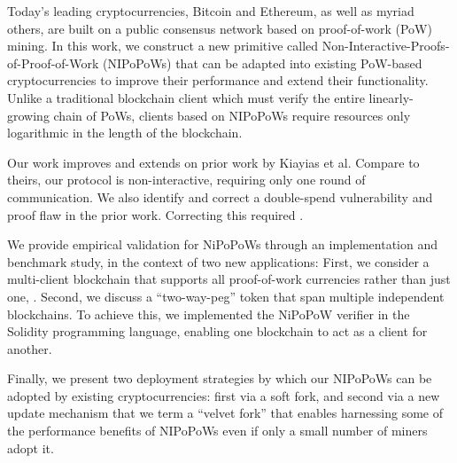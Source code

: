 Today's leading cryptocurrencies, Bitcoin and Ethereum, as well as myriad others, are built on a public consensus network based on proof-of-work (PoW) mining. In this work, we construct a new primitive called Non-Interactive-Proofs-of-Proof-of-Work (NIPoPoWs) that can be adapted into existing PoW-based cryptocurrencies to improve their performance and extend their functionality.
Unlike a traditional blockchain client
which must verify the entire linearly-growing chain of PoWs, clients based on
NIPoPoWs require resources only logarithmic in the length of the blockchain.

Our work improves and extends on prior work by Kiayias et al. Compare to theirs, our protocol is non-interactive, requiring only one round of communication. We also identify and correct a double-spend vulnerability and proof flaw in the prior work. Correcting this required .

We provide empirical validation for NiPoPoWs through an implementation and benchmark study, in the context of two new applications:
First, we consider a multi-client blockchain that supports all proof-of-work currencies rather than just one, .
Second, we discuss a ``two-way-peg'' token that span multiple independent blockchains. To achieve this, we implemented the NiPoPoW verifier in the Solidity programming language, enabling one blockchain to act as a client for another.

 Finally, we present two deployment strategies by which our NIPoPoWs can be adopted by existing cryptocurrencies: first via a soft fork, and second via a new update mechanism that we
term a ``velvet fork'' that enables harnessing some of the performance benefits
of NIPoPoWs even if only a small number of miners adopt it.
